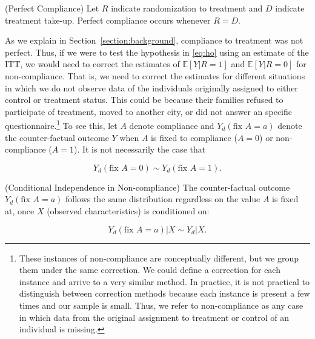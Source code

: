 \noindent \begin{assumption} \normalfont (Perfect Compliance) Let $R$ indicate randomization to treatment and $D$ indicate treatment take-up. Perfect compliance occurs whenever  $R = D$.\end{assumption}

\noindent As we explain in Section~\ref{section:background}, compliance to treatment was not perfect. Thus, if we were to test the hypothesis in \eqref{eq:ho} using an estimate of the ITT, we would need to correct the estimates of $\mathbb{E} \left[ Y | R = 1 \right]$ and $\mathbb{E} \left[ Y | R = 0 \right]$ for non-compliance. That is, we need to correct the estimates for different situations in which we do not observe data of the individuals originally assigned to either control or treatment status. This could be because their families refused to participate of treatment, moved to another city, or did not answer an specific questionnaire.\footnote{These instances of non-compliance are conceptually different, but we group them under the same correction. We could define a correction for each instance and arrive to a very similar method. In practice, it is not practical to distinguish between correction methods because each instance is present a few times and our sample is small. Thus, we refer to non-compliance as any case in which data from the original assignment to treatment or control of an individual is missing.} To see this, let $A$ denote compliance and $Y_{d} \left(\text{fix } A = a \right)$ denote the counter-factual outcome $Y$ when $A$ is fixed to compliance ($A = 0$) or non-compliance ($A = 1$). It is not necessarily the case that 

\begin{equation}
Y_{d} \left(\text{fix } A = 0 \right) \sim Y_{d} \left(\text{fix } A = 1 \right). 
\end{equation}

\begin{assumption} \normalfont \label{assumption:balance} (Conditional Independence in Non-compliance) The counter-factual outcome $Y_{d} \left(\text{fix } A = a \right)$ follows the same distribution regardless on the value $A$ is fixed at, once $X$ (observed characteristics) is conditioned on: 

\begin{equation}
Y_{d} \left(\text{fix } A = a \right) | X \sim Y_{d} | X. 
\end{equation}

\end{assumption}

